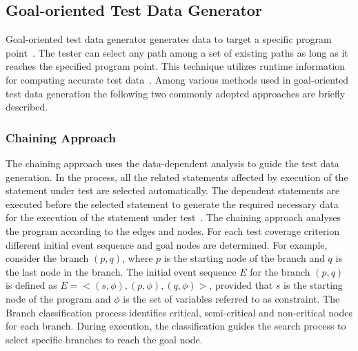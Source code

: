 

\subsection{Goal-oriented Test Data Generator}
\label{sec:goaloriented_2}
Goal-oriented test data generator generates data to target a specific program point~\cite{chungautomated}. The tester can select any path among a set of existing paths as long as it reaches the specified program point. This technique utilizes runtime information for computing accurate test data~\cite{ferguson1996chaining}. Among various methods used in goal-oriented test data generation the following two commonly adopted approaches are briefly described.

\subsubsection{Chaining Approach}
The chaining approach uses the data-dependent analysis to guide the test data generation. In the process, all the related statements affected by execution of the statement under test are selected automatically. The dependent statements are executed before the selected statement to generate the required necessary data for the execution of the statement under test~\cite{ferguson1996chaining}. The chaining approach analyses the program according to the edges and nodes. For each test coverage criterion different initial event sequence and goal nodes are determined. For example, consider  the branch $(p, q)$, where $p$ is  the starting node of the branch and $q$ is the last node in the branch. The initial event sequence $E$ for the branch $(p, q)$ is defined as $E =< (s,\phi), (p,\phi),(q,\phi) >$, provided that $s$ is the starting node of the program and $\phi$ is the set of variables referred to as constraint. The Branch classification process identifies critical, semi-critical and non-critical nodes for each branch. During execution, the classification guides the search process to select specific branches to reach the goal node.  

